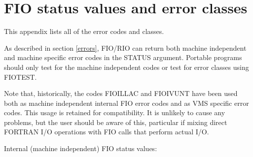 \documentclass[twoside,11pt]{article}
\renewcommand{\_}{\texttt{\symbol{95}}}
\begin{document}
\section{FIO status values and error classes}
\label{status-values}

This appendix lists all of the error codes and classes.

As described in section \ref{errors}, FIO/RIO can return both machine
independent and machine specific error codes in the STATUS argument. Portable
programs should only test for the machine independent codes or test for error
classes using FIO\_TEST.

Note that, historically, the codes FIO\_\_ILLAC and FIO\_\_IVUNT have been used
both as machine independent internal FIO error codes and as VMS specific error
codes. This usage is retained for compatibility. It is unlikely to cause any
problems, but the user should be aware of this, particular if mixing direct
FORTRAN I/O operations with FIO calls that perform actual I/O.

Internal (machine independent) FIO status values:
\end{document}
